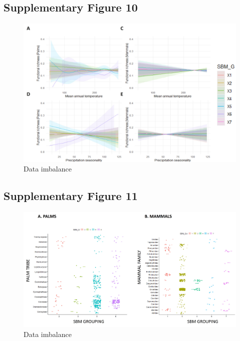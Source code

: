 \documentclass[
]{agujournal2019}
\begin{document}
\subsection{Supplementary Figure 10}

\begin{figure}[H]

{\centering \includegraphics[width=5.67708in,height=\textheight]{sup_figures/fr_model_predictions.jpg}

}

\caption{Data imbalance}

\end{figure}%

\subsection{Supplementary Figure 11}

\begin{figure}[H]

{\centering \includegraphics[width=5.67708in,height=\textheight]{sup_figures/sup_SBM_taxonomy.jpg}

}

\caption{Data imbalance}

\end{figure}%
\end{document}
